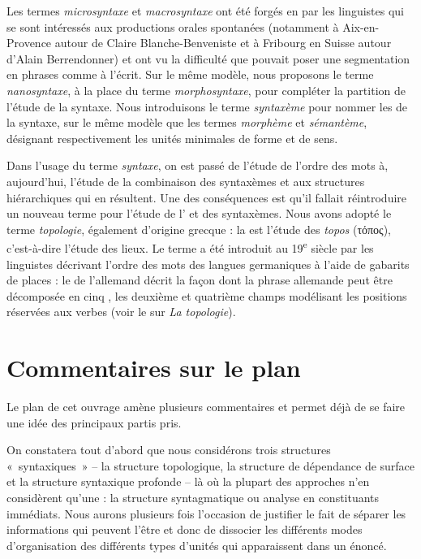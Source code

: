 {    Les termes \textit{microsyntaxe} et \textit{macrosyntaxe} ont été forgés en \citeyear{berrendonner1990pour} par les linguistes qui se sont intéressés aux productions orales spontanées (notamment à Aix-en-Provence autour de Claire Blanche-Benveniste et à Fribourg en Suisse autour d’Alain Berrendonner) et ont vu la difficulté que pouvait poser une segmentation en phrases comme à l’écrit. Sur le même modèle, nous proposons le terme \textit{nanosyntaxe}, à la place du terme \textit{morphosyntaxe}, pour compléter la partition de l’étude de la syntaxe. Nous introduisons le terme \textit{syntaxème} pour nommer les  de la syntaxe, sur le même modèle que les termes \textit{morphème} et \textit{sémantème}, désignant respectivement les unités minimales de forme et de sens.

    Dans l’usage du terme \textit{syntaxe}, on est passé de l’étude de l’ordre des mots à, aujourd’hui, l’étude de la combinaison des syntaxèmes et aux structures hiérarchiques qui en résultent. Une des conséquences est qu’il fallait réintroduire un nouveau terme pour l’étude de l’ et des syntaxèmes. Nous avons adopté le terme \textit{topologie}, également d’origine grecque : la  est l’étude des \textit{topos} (τόπος), c’est-à-dire l’étude des lieux. Le terme a été introduit au 19\textsuperscript{e} siècle par les linguistes décrivant l’ordre des mots des langues germaniques à l’aide de gabarits de places : le  de l’allemand décrit la façon dont la phrase allemande peut être décomposée en cinq , les deuxième et quatrième champs modélisant les positions réservées aux verbes (voir le  sur \textit{La topologie}).
}
\section{Commentaires sur le plan}\label{sec:0.0.10}

Le plan de cet ouvrage amène plusieurs commentaires et permet déjà de se faire une idée des principaux partis pris.

\begin{sloppypar}
On constatera tout d’abord que nous considérons trois structures «~syntaxiques~» – la structure topologique, la structure de dépendance de surface et la structure syntaxique profonde – là où la plupart des approches n’en considèrent qu’une : la structure syntagmatique ou analyse en constituants immédiats. Nous aurons plusieurs fois l’occasion de justifier le fait de séparer les informations qui peuvent l’être et donc de dissocier les différents modes d’organisation des différents types d’unités qui apparaissent dans un énoncé.
\end{sloppypar}

